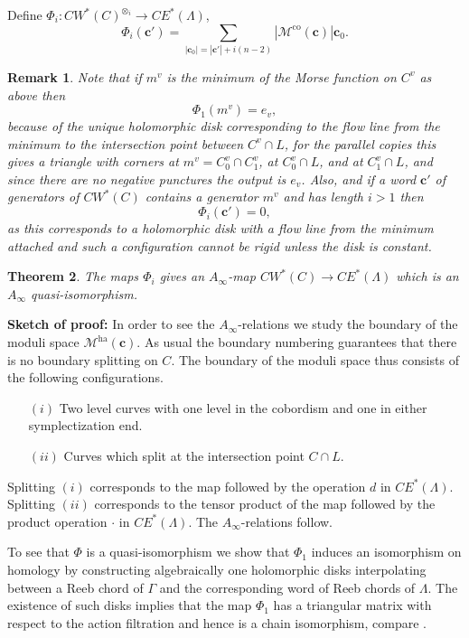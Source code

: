 \documentclass{gtpart}
\newtheorem{thm}{Theorem}
\newtheorem{rem}[thm]{Remark}
\renewcommand{\co}{\mathrm{co}}
\newcommand{\ha}{\mathrm{ha}}
\begin{document}
Define $\Phi_{i}\colon CW^{\ast}(C)^{\otimes_{i}}\to CE^{\ast}(\Lambda)$, 
\[ 
\Phi_i(\mathbf{c}')=\sum_{|\mathbf{c}_{0}|=|\mathbf{c}'|+i(n-2)}
|\mathcal{M}^{\co}(\mathbf{c})|\mathbf{c}_{0}.
\]
\begin{rem}
Note that if $m^{v}$ is the minimum of the Morse function on $C^{v}$ as above then 
\[ 
\Phi_{1}(m^{v})=e_{v},
\]
because of the unique holomorphic disk corresponding to the flow line from the minimum to the intersection point between $C^{v}\cap L$, for the parallel copies this gives a triangle with corners at $m^{v}=C^{v}_{0}\cap C^{v}_{1}$, at $C^{v}_{0}\cap L$, and at $C^{v}_{1}\cap L$, and since there are no negative punctures the output is $e_{v}$. Also,
and if a word $\mathbf{c}'$ of generators of $CW^{\ast}(C)$ contains a generator $m^{v}$ and has length $i>1$ then 
\[ 
\Phi_{i}(\mathbf{c}')=0,
\]
as this corresponds to a holomorphic disk with a flow line from the minimum attached and such a configuration cannot be rigid unless the disk is constant.
\end{rem}

\begin{thm}\label{l:BEEdiagonal}
The maps $\Phi_i$ gives an $A_{\infty}$-map $CW^{\ast}(C)\to CE^{\ast}(\Lambda)$ which is an $A_{\infty}$ quasi-isomorphism.	
\end{thm}

{\bf Sketch of proof:} In order to see the $A_{\infty}$-relations we study the boundary of the moduli space $\mathcal{M}^{\ha}(\mathbf{c})$. As usual the boundary numbering guarantees that there is no boundary splitting on $C$. The boundary of the moduli space thus consists of the following configurations. 
\begin{itemize}
\item[$(i)$] Two level curves with one level in the cobordism and one in either symplectization end.
\item[$(ii)$] Curves which split at the intersection point $C\cap L$.
\end{itemize}
Splitting $(i)$ corresponds to the map followed by the operation $d$ in
    $CE^{\ast}(\Lambda)$. Splitting $(ii)$ corresponds to the tensor product of the map followed by the product operation $\cdot$ in
    $CE^{\ast}(\Lambda)$. The $A_{\infty}$-relations follow.  

To see that $\Phi$ is a quasi-isomorphism we show that $\Phi_{1}$ induces an isomorphism on homology by constructing algebraically one holomorphic disks interpolating between a Reeb chord of $\Gamma$ and the corresponding word of Reeb chords of $\Lambda$. The existence of such disks implies that the map $\Phi_{1}$ has a triangular matrix with respect to the action filtration and hence is a chain isomorphism, compare \cite[Section 6.2]{BEE}. 
\end{document}
